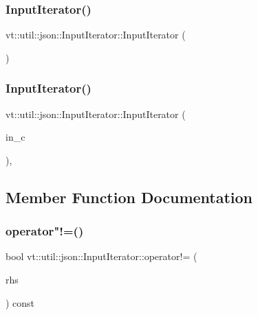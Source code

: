 \subsubsection{\texorpdfstring{Input\+Iterator()}{InputIterator()}\hspace{0.1cm}{\footnotesize\ttfamily [1/2]}}
{\footnotesize\ttfamily vt\+::util\+::json\+::\+Input\+Iterator\+::\+Input\+Iterator (\begin{DoxyParamCaption}{ }\end{DoxyParamCaption})\hspace{0.3cm}{\ttfamily [default]}}

\mbox{\label{structvt_1_1util_1_1json_1_1_input_iterator_af09c946a493856653ba6c790b35d9e33}} 
\subsubsection{\texorpdfstring{Input\+Iterator()}{InputIterator()}\hspace{0.1cm}{\footnotesize\ttfamily [2/2]}}
{\footnotesize\ttfamily vt\+::util\+::json\+::\+Input\+Iterator\+::\+Input\+Iterator (\begin{DoxyParamCaption}\item[{\hyperlink{structvt_1_1util_1_1json_1_1_decompression_input_container}{Decompression\+Input\+Container} const $\ast$}]{in\+\_\+c }\end{DoxyParamCaption})\hspace{0.3cm}{\ttfamily [inline]}, {\ttfamily [explicit]}}



\subsection{Member Function Documentation}
\mbox{\label{structvt_1_1util_1_1json_1_1_input_iterator_a12d5ee7bb678281ddbd8bda5d09b881f}} 
\subsubsection{\texorpdfstring{operator"!=()}{operator!=()}}
{\footnotesize\ttfamily bool vt\+::util\+::json\+::\+Input\+Iterator\+::operator!= (\begin{DoxyParamCaption}\item[{\hyperlink{structvt_1_1util_1_1json_1_1_input_iterator}{Input\+Iterator} const \&}]{rhs }\end{DoxyParamCaption}) const\hspace{0.3cm}{\ttfamily [inline]}}

